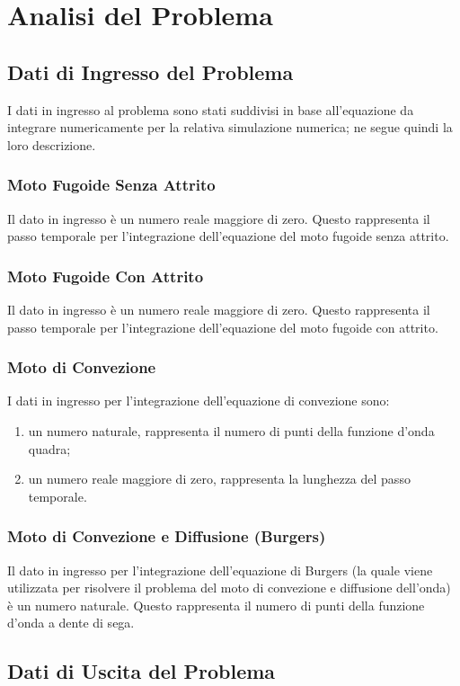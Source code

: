 \section{Analisi del Problema} 

\subsection{Dati di Ingresso del Problema}
I dati in ingresso al problema sono stati suddivisi in base all'equazione da integrare numericamente per la relativa simulazione numerica; ne segue quindi la loro descrizione.

\subsubsection*{Moto Fugoide Senza Attrito}
Il dato in ingresso è un numero reale maggiore di zero.
Questo rappresenta il passo temporale per l'integrazione dell'equazione del moto fugoide senza attrito.
\subsubsection*{Moto Fugoide Con Attrito}
Il dato in ingresso è un numero reale maggiore di zero. Questo rappresenta il passo temporale per l'integrazione dell'equazione del moto fugoide con attrito.
\subsubsection*{Moto di Convezione}
    I dati in ingresso per l'integrazione dell'equazione di convezione sono:
    \begin{enumerate}
        \item un numero naturale, rappresenta il numero di punti della funzione d'onda quadra;
        \item un numero reale maggiore di zero, rappresenta la lunghezza del passo temporale.
    \end{enumerate}
\subsubsection*{Moto di Convezione e Diffusione (Burgers)}
Il dato in ingresso per l'integrazione dell'equazione di Burgers (la quale viene utilizzata per risolvere il problema del moto di convezione e diffusione dell'onda) è un numero naturale. Questo rappresenta il numero di punti della funzione d'onda a dente di sega.

\subsection{Dati di Uscita del Problema}

